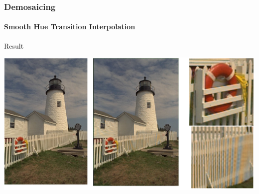 \documentclass{beamer}
\begin{document}
\begin{frame}
\frametitle{Demosaicing}
\framesubtitle{Smooth Hue Transition Interpolation}
\begin{block}{Result}
\begin{center}
\includegraphics[scale=0.35]{images/L7_res_SHT.png}
\end{center}
\end{block}
\end{frame}
\end{document}
